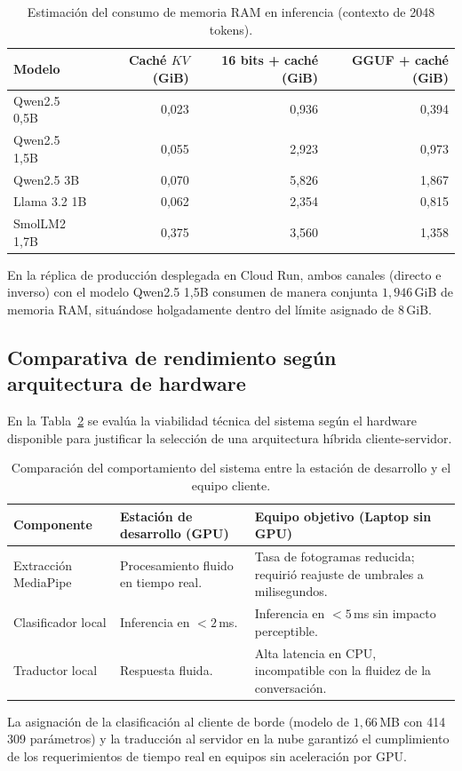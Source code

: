 \begin{table}[H]
\centering
\footnotesize
\caption{Estimación del consumo de memoria RAM en inferencia (contexto de 2048 tokens).}
\label{tab:ram_inferencia}
\begin{tabular}{lrrr}
\toprule
\textbf{Modelo} & \textbf{Caché \(KV\) (GiB)} & \textbf{16 bits + caché (GiB)} & \textbf{GGUF + caché (GiB)} \\
\midrule
Qwen2.5 0,5B & 0,023 & 0,936 & 0,394 \\
Qwen2.5 1,5B & 0,055 & 2,923 & 0,973 \\
Qwen2.5 3B   & 0,070 & 5,826 & 1,867 \\
Llama 3.2 1B & 0,062 & 2,354 & 0,815 \\
SmolLM2 1,7B & 0,375 & 3,560 & 1,358 \\
\bottomrule
\end{tabular}
\end{table}

En la réplica de producción desplegada en Cloud Run, ambos canales (directo e inverso) con el modelo Qwen2.5 1,5B consumen de manera conjunta $1{,}946$\,GiB de memoria RAM, situándose holgadamente dentro del límite asignado de $8$\,GiB.

\subsection{Comparativa de rendimiento según arquitectura de hardware}
En la Tabla~\ref{tab:hw_comparacion} se evalúa la viabilidad técnica del sistema según el hardware disponible para justificar la selección de una arquitectura híbrida cliente-servidor.

\begin{table}[H]
    \centering
    \small
    \caption{Comparación del comportamiento del sistema entre la estación de desarrollo y el equipo cliente.}
    \label{tab:hw_comparacion}
    \begin{tabularx}{\textwidth}{@{}>{\raggedright\arraybackslash}p{} >{\raggedright\arraybackslash}X >{\raggedright\arraybackslash}X@{}}
        \toprule
        \textbf{Componente} & \textbf{Estación de desarrollo (GPU)} & \textbf{Equipo objetivo (Laptop sin GPU)} \\
        \midrule
        Extracción MediaPipe & Procesamiento fluido en tiempo real. & Tasa de fotogramas reducida; requirió reajuste de umbrales a milisegundos. \\
        Clasificador local & Inferencia en $< 2$\,ms. & Inferencia en $< 5$\,ms sin impacto perceptible. \\
        Traductor local & Respuesta fluida. & Alta latencia en CPU, incompatible con la fluidez de la conversación. \\
        \bottomrule
    \end{tabularx}
\end{table}

La asignación de la clasificación al cliente de borde (modelo de $1{,}66$\,MB con 414\,309 parámetros) y la traducción al servidor en la nube garantizó el cumplimiento de los requerimientos de tiempo real en equipos sin aceleración por GPU.